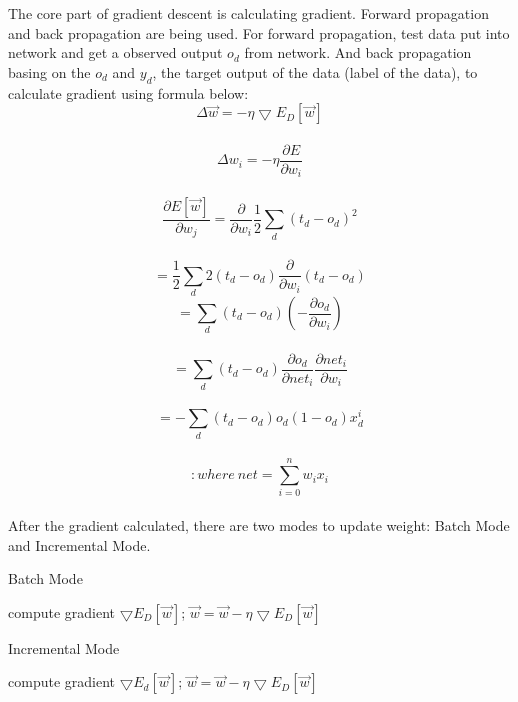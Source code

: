 \documentclass[letterpaper]{article}
\begin{document}
The core part of gradient descent is calculating gradient. Forward propagation and back propagation are being used. For forward propagation, test data put into network and get a observed output $o_{d}$ from network. And back propagation basing on the $o_{d}$ and $y_{d}$, the target output of the data (label of the data), to calculate gradient using formula below:\\
$$\Delta \overrightarrow{w} =  - \eta \bigtriangledown E_{D}[\overrightarrow{w}]$$\\
$$\Delta w_{i} =  - \eta \frac{\partial E}{\partial w_{i}}$$\\
$$\frac{\partial E[\overrightarrow{w}]}{\partial w_{j}} =   \frac{\partial }{\partial w_{i}}\frac{1}{2} \sum_{d}(t_{d}-o_{d})^{2}$$\\
$$=   \frac{1}{2} \sum_{d} 2(t_{d}-o_{d})\frac{\partial }{\partial w_{i}}(t_{d}-o_{d})$$
$$=   \sum_{d} (t_{d}-o_{d})(-\frac{\partial o_{d}}{\partial w_{i}})$$\\
$$=   \sum_{d} (t_{d}-o_{d})\frac{\partial o_{d}}{\partial net_{i}}\frac{\partial net_{i}}{\partial w_{i}}$$\\
$$=   -\sum_{d} (t_{d}-o_{d})o_{d}(1-o_{d})x_{d}^i$$\\
$$:where \ net=   \sum_{i=0}^{n} w_{i}x_{i}$$\\

After the gradient calculated, there are two modes to update weight: Batch Mode and Incremental Mode.
\begin{algorithm}[H]  
  \caption{Batch Mode}  
  \label{alg::conjugateGradient}  
  \begin{algorithmic}[1]  
    \Repeat  
      \State compute gradient $\bigtriangledown E_{D}[\overrightarrow{w}]$;  
      \State $\overrightarrow{w} = \overrightarrow{w} - \eta \bigtriangledown E_{D}[\overrightarrow{w}]$  
  \end{algorithmic}  
\end{algorithm} 
 \begin{algorithm}[H]  
  \caption{Incremental Mode}  
  \label{alg::conjugateGradient}  
  \begin{algorithmic}[1]  
    \Repeat  
       \State compute gradient $\bigtriangledown E_{d}[\overrightarrow{w}]$;  
       \State $\overrightarrow{w} = \overrightarrow{w} - \eta \bigtriangledown E_{D}[\overrightarrow{w}]$  
      \EndFor 
  \end{algorithmic}  
\end{algorithm}
\end{document}
